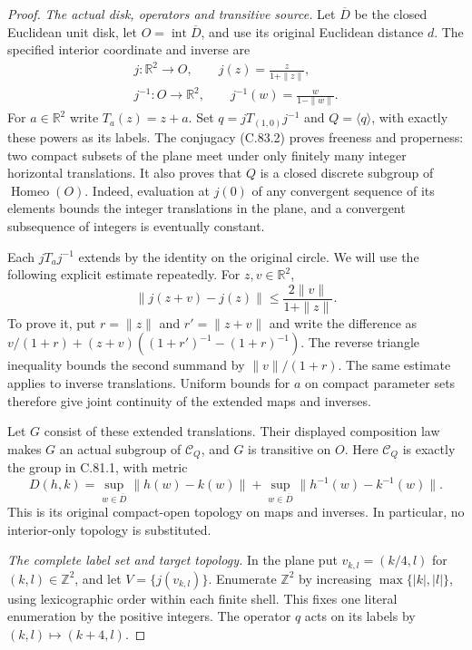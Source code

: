 \begin{proof}
\emph{The actual disk, operators and transitive source.}
Let $\overline D$ be the closed Euclidean
unit disk, let $O=\operatorname{int}\overline D$,
and use its original Euclidean distance $d$.
The specified interior coordinate and inverse are
\[
 \begin{gathered}
 j:\mathbb R^2\longrightarrow O,\qquad
       j(z)=\frac{z}{1+\|z\|},\\
 j^{-1}:O\longrightarrow\mathbb R^2,\qquad
       j^{-1}(w)=\frac{w}{1-\|w\|}.
 \end{gathered}                                                  \tag{C.83.2}
\]
For $a\in\mathbb R^2$ write $T_a(z)=z+a$.
Set $q=jT_{(1,0)}j^{-1}$ and $Q=\langle q\rangle$,
with exactly these powers as its labels.
The conjugacy (C.83.2) proves freeness and
properness: two compact subsets of the plane
meet under only finitely many integer horizontal
translations. It also proves that $Q$ is a
closed discrete subgroup of $\operatorname{Homeo}(O)$.
Indeed, evaluation at $j(0)$ of any convergent
sequence of its elements bounds the integer
translations in the plane, and a convergent
subsequence of integers is eventually constant.

Each $jT_a j^{-1}$ extends by the identity
on the original circle. We will use the
following explicit estimate repeatedly.
For $z,v\in\mathbb R^2$,
\[
 \|j(z+v)-j(z)\|
       \leq\frac{2\|v\|}{1+\|z\|}.
                                                               \tag{C.83.3}
\]
To prove it, put $r=\|z\|$ and $r'=\|z+v\|$
and write the difference as
$v/(1+r)+(z+v)((1+r')^{-1}-(1+r)^{-1})$.
The reverse triangle inequality bounds the
second summand by $\|v\|/(1+r)$.
The same estimate applies to inverse
translations. Uniform bounds for $a$ on
compact parameter sets therefore give joint
continuity of the extended maps and inverses.

Let $G$ consist of these extended translations.
Their displayed composition law makes $G$
an actual subgroup of $\mathscr C_Q$,
and $G$ is transitive on $O$.
Here $\mathscr C_Q$ is exactly the group in
C.81.1, with metric
\[
 D(h,k)=
 \sup_{w\in\overline D}\|h(w)-k(w)\|
 +\sup_{w\in\overline D}\|h^{-1}(w)-k^{-1}(w)\|.
                                                               \tag{C.83.4}
\]
This is its original compact-open topology
on maps and inverses. In particular, no
interior-only topology is substituted.

\emph{The complete label set and target topology.}
In the plane put
$v_{k,l}=(k/4,l)$ for $(k,l)\in\mathbb Z^2$,
and let $V=\{j(v_{k,l})\}$.
Enumerate $\mathbb Z^2$ by increasing
$\max\{|k|,|l|\}$, using lexicographic order
within each finite shell. This fixes one
literal enumeration by the positive integers.
The operator $q$ acts on its labels by
$(k,l)\mapsto(k+4,l)$.


\end{proof}
